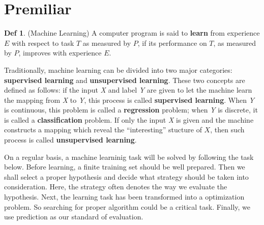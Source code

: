 \documentclass{book}
\begin{document}
\theoremstyle{definition} 
\newtheorem{define}{Def}[section]

\theoremstyle{plain} 
\newtheorem{thm}{Theorem}[section] \newtheorem{lema}{Lemma}[chapter] \newtheorem{cor}{Corollary}[chapter]
\newtheorem{prop}{Property}[chapter] \newtheorem{fact}{Fact}[chapter] 


\mainmatter

\chapter*{Premiliar}

\begin{define}(Machine Learning)
    A computer program is said to \textbf{learn} from experience $E$ with respect to task $T$ as measured by $P$, if its performance on $T$,
    as measured by $P$, improves with experience $E$.
\end{define}

\par
Traditionally, machine learning can be divided into two major categories: \textbf{supervised learning} and \textbf{unsupervised learning}. These two concepts are defined as follows:
if the input \textit{X} and label \textit{Y} are given to let the machine learn the mapping from \textit{X} to \textit{Y}, this process is called \textbf{supervised learning}. When
\textit{Y} is continuous, this problem is called a \textbf{regression} problem; when \textit{Y} is discrete, it is called a \textbf{classification} problem. If only the input \textit{X}
is given and the machine constructs a mapping which reveal the ``interesting'' stucture of $X$, then such process is called \textbf{unsupervised learning}.

On a regular basis, a machine learninig task will be solved by following the task below. Before learning, a finite training set should be well prepared. Then we shall select a proper hypothesis and
decide what strategy should be taken into consideration. Here, the strategy often denotes the way we evaluate the hypothesis. Next, the learning task has been transformed into a optimization problem. So searching for proper algorithm could be a critical task. Finally,
we use prediction as our standard of evaluation.
\end{document}
